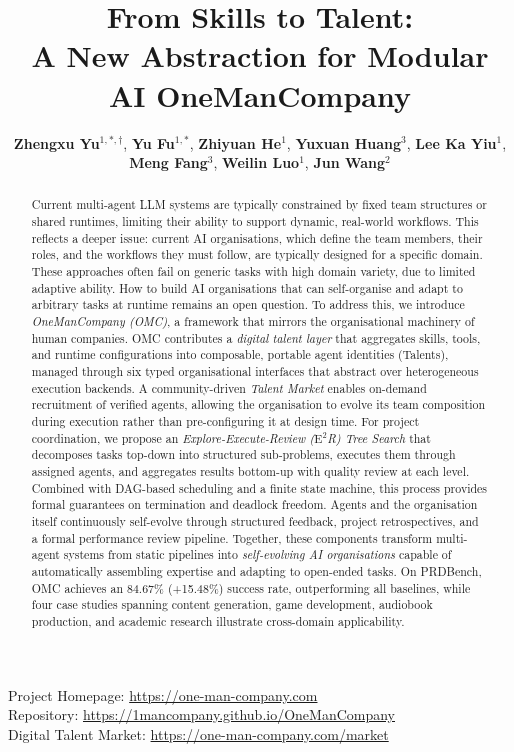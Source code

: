 \documentclass[11pt,a4paper]{article}
\title{\bfseries\color{titleRed}
From Skills to Talent: \\[2pt]
A New Abstraction for Modular AI OneManCompany}
\author{
\textbf{Zhengxu Yu}$^{1,*,\dagger}$,
\textbf{Yu Fu}$^{1,*}$,
\textbf{Zhiyuan He}$^{1}$,
\textbf{Yuxuan Huang}$^{3}$,
\textbf{Lee Ka Yiu}$^{1}$,\\
\textbf{Meng Fang}$^{3}$,
\textbf{Weilin Luo}$^{1}$,
\textbf{Jun Wang}$^{2}$
}
\date{}
\begin{document}
\vspace{-3.2cm}
\maketitle
\thispagestyle{empty}
\vspace{-1.6em}

\begin{center}
Project Homepage: \url{https://one-man-company.com} \\
Repository: \url{https://1mancompany.github.io/OneManCompany}\\
Digital Talent Market: \url{https://one-man-company.com/market}
\end{center}

\begin{abstract}
Current multi-agent LLM systems are typically constrained by fixed team structures or shared runtimes, limiting their ability to support dynamic, real-world workflows.  This reflects a deeper issue: current AI organisations, which define the team members, their roles, and the workflows they must follow, are typically designed for a specific domain.  These approaches often fail on generic tasks with high domain variety, due to limited adaptive ability.  How to build AI organisations that can self-organise and adapt to arbitrary tasks at runtime remains an open question.  To address this, we introduce \emph{OneManCompany (OMC)}, a framework that mirrors the organisational machinery of human companies.  OMC contributes a \emph{digital talent layer} that aggregates skills, tools, and runtime configurations into composable, portable agent identities (Talents), managed through six typed organisational interfaces that abstract over heterogeneous execution backends.  A community-driven \emph{Talent Market} enables on-demand recruitment of verified agents, allowing the organisation to evolve its team composition during execution rather than pre-configuring it at design time.
For project coordination, we propose an \emph{Explore-Execute-Review ($\text{E}^2$R) Tree Search} that decomposes tasks top-down into structured sub-problems, executes them through assigned agents, and aggregates results bottom-up with quality review at each level.  Combined with DAG-based scheduling and a finite state machine, this process provides formal guarantees on termination and deadlock freedom.  Agents and the organisation itself continuously self-evolve through structured feedback, project retrospectives, and a formal performance review pipeline.
Together, these components transform multi-agent systems from static pipelines into \emph{self-evolving AI organisations} capable of automatically assembling expertise and adapting to open-ended tasks.  On PRDBench, OMC achieves an 84.67\% (+15.48\%) success rate, outperforming all baselines, while four case studies spanning content generation, game development, audiobook production, and academic research illustrate cross-domain applicability.
\end{abstract}
\end{document}
